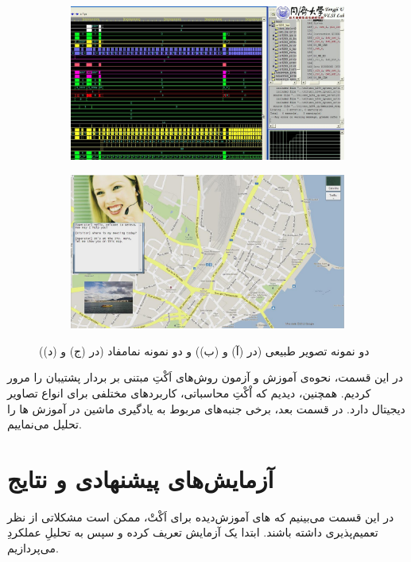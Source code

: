 \documentclass[twocolumn]{article}
\begin{document}
\begin{figure}
	\\
	\begin{subfigure}{0.24\textwidth}
		\includegraphics[width=\textwidth]{SCI30.jpg}
		\caption{}
		\label{fig:sci_1}
	\end{subfigure}
	\hfill
	\begin{subfigure}{0.24\textwidth}
		\includegraphics[width=\textwidth]{SCI33.jpg}
		\caption{}
		\label{fig:sci_2}
	\end{subfigure}
	\caption{دو نمونه تصویر طبیعی (در (آ) و (ب)) و دو نمونه نمامفاد (در (ج) و (د))}
	\label{fig:nsi_sci}
\end{figure}


در این قسمت، نحوه‌ی آموزش و آزمون روش‌های اَکْتِ مبتنی بر بردار پشتیبان را مرور کردیم. همچنین، دیدیم که اْکْتِ محاسباتی، کاربردهای مختلفی برای انواع تصاویر دیجیتال دارد. در قسمت بعد، برخی جنبه‌های مربوط به یادگیری ماشین در آموزش ها را تحلیل می‌نماییم.
\section{آزمایش‌های پیشنهادی و نتایج} \label{sec:experiments}
در این قسمت می‌بینیم که های آموزش‌دیده برای اَکْتْ، ممکن است مشکلاتی از نظر تعمیم‌پذیری داشته باشند. ابتدا یک آزمایش تعریف کرده و سپس به تحلیلِ عملکردِ  می‌پردازیم.
\end{document}
